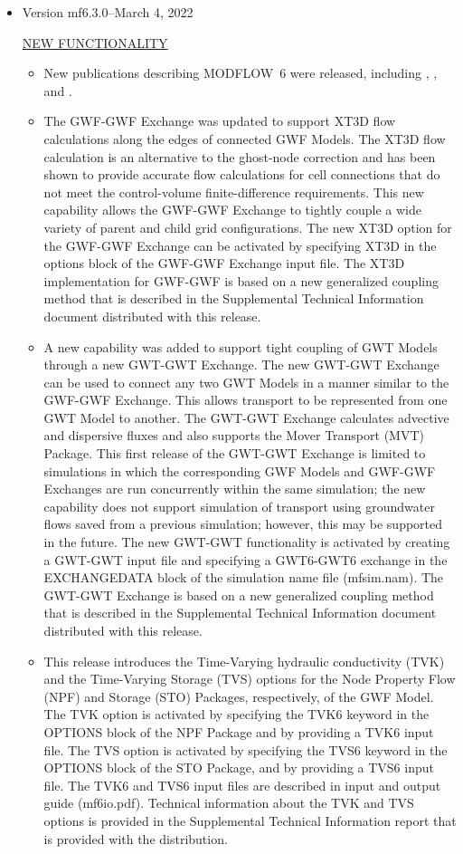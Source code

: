 \documentclass[11pt,twoside,twocolumn]{usgsreport}
\begin{document}
\begin{itemize}
	
	\item Version mf6.3.0--March 4, 2022
	
	\underline{NEW FUNCTIONALITY}
	\begin{itemize}
		\item New publications describing MODFLOW~6 were released, including \cite{modflow6api}, \cite{modflow6gwt}, and \cite{modflow6csub}. 
	        \item The GWF-GWF Exchange was updated to support XT3D flow calculations along the edges of connected GWF Models.  The XT3D flow calculation is an alternative to the ghost-node correction and has been shown to provide accurate flow calculations for cell connections that do not meet the control-volume finite-difference requirements.  This new capability allows the GWF-GWF Exchange to tightly couple a wide variety of parent and child grid configurations.  The new XT3D option for the GWF-GWF Exchange can be activated by specifying XT3D in the options block of the GWF-GWF Exchange input file.  The XT3D implementation for GWF-GWF is based on a new generalized coupling method that is described in the Supplemental Technical Information document distributed with this release.
	        \item A new capability was added to support tight coupling of GWT Models through a new GWT-GWT Exchange.  The new GWT-GWT Exchange can be used to connect any two GWT Models in a manner similar to the GWF-GWF Exchange.  This allows transport to be represented from one GWT Model to another.  The GWT-GWT Exchange calculates advective and dispersive fluxes and also supports the Mover Transport (MVT) Package.  This first release of the GWT-GWT Exchange is limited to simulations in which the corresponding GWF Models and GWF-GWF Exchanges are run concurrently within the same simulation; the new capability does not support simulation of transport using groundwater flows saved from a previous simulation; however, this may be supported in the future.  The new GWT-GWT functionality is activated by creating a GWT-GWT input file and specifying a GWT6-GWT6 exchange in the EXCHANGEDATA block of the simulation name file (mfsim.nam).  The GWT-GWT Exchange is based on a new generalized coupling method that is described in the Supplemental Technical Information document distributed with this release.
	        \item This release introduces the Time-Varying hydraulic conductivity (TVK) and the Time-Varying Storage (TVS) options for the Node Property Flow (NPF) and Storage (STO) Packages, respectively, of the GWF Model.  The TVK option is activated by specifying the TVK6 keyword in the OPTIONS block of the NPF Package and by providing a TVK6 input file.  The TVS option is activated by specifying the TVS6 keyword in the OPTIONS block of the STO Package, and by providing a TVS6 input file.  The TVK6 and TVS6 input files are described in input and output guide (mf6io.pdf).  Technical information about the TVK and TVS options is provided in the Supplemental Technical Information report that is provided with the distribution.

\end{itemize}
\end{itemize}
\end{document}
